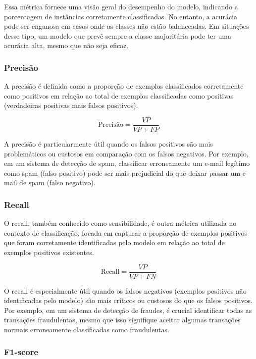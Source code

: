 Essa métrica fornece uma visão geral do desempenho do modelo, indicando a porcentagem de instâncias corretamente classificadas.
No entanto, a acurácia pode ser enganosa em casos onde as classes não estão balanceadas. 
Em situações desse tipo, um modelo que prevê sempre a classe majoritária pode ter uma acurácia alta, mesmo que não seja eficaz.

\subsubsection{Precisão}

A precisão é definida como a proporção de exemplos classificados corretamente como positivos em 
relação ao total de exemplos classificadas como positivas (verdadeiras positivas mais falsos positivos).

\begin{equation}
  \text{Precisão} = \frac{VP}{VP + FP}
\end{equation}

A precisão é particularmente útil quando os falsos positivos são mais problemáticos ou custosos
em comparação com os falsos negativos. Por exemplo, em um sistema de detecção de spam, classificar 
erroneamente um e-mail legítimo como spam (falso positivo) pode ser mais prejudicial do que deixar
passar um e-mail de spam (falso negativo).

\subsubsection{Recall}

O recall, também conhecido como sensibilidade, é outra métrica utilizada no contexto de classificação, 
focada em capturar a proporção de exemplos positivos que foram corretamente identificadas pelo modelo
em relação ao total de exemplos positivos existentes.

\begin{equation}
  \text{Recall} = \frac{VP}{VP + FN}
\end{equation}

O recall é especialmente útil quando os falsos negativos (exemplos positivos não identificadas pelo modelo) 
são mais críticos ou custosos do que os falsos positivos. Por exemplo, em um sistema de detecção de fraudes,
é crucial identificar todas as transações fraudulentas, mesmo que isso signifique aceitar algumas transações 
normais erroneamente classificadas como fraudulentas.


\subsubsection{F1-score}


